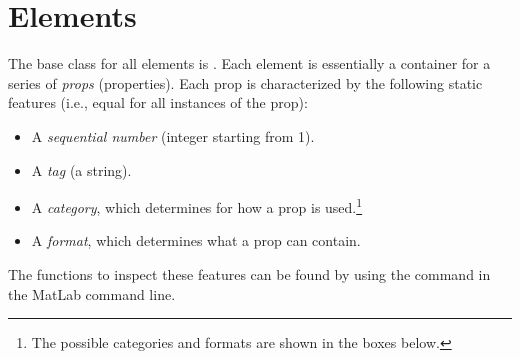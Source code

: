 \documentclass{tufte-handout}
\begin{document}
\section{Elements}

The base class for all elements is . 
Each element is essentially a container for a series of \emph{props} (properties). Each prop is characterized by the following static features (i.e., equal for all instances of the prop):
\begin{itemize}
	\item A \emph{sequential number} (integer starting from 1).
		
	\item A \emph{tag} (a string).
	
	\item A \emph{category}, which determines for how a prop is used.\footnote{The possible categories and formats are shown in the boxes below.}
	
	\item A \emph{format}, which determines what a prop can contain.
\end{itemize}
The functions to inspect these features can be found by using the command  in the MatLab command line.
\end{document}
